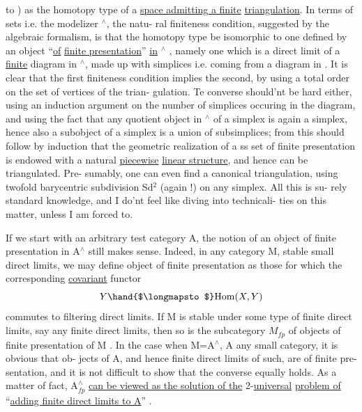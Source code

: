 to )  as the homotopy type of a \uline{space admitting a finite}
\uline{triangulation}.  In terms of  sets i.e.  the modelizer \hand{$\Delta$}$^\wedge$,  the natu-%
ral finiteness condition,  suggested by the algebraic formalism,  is
that the homotopy type be isomorphic to one defined by an object ``\uline{of}
\uline{finite presentation}'' \uline{in} \hand{$\Delta$}$^\wedge$ ,  namely one which is a direct limit of
a \uline{finite} diagram in \hand{$\Delta$}$^\wedge$,  made up with simplices  i.e. coming from a
diagram in \hand{$\Delta$}.  It is clear that the first finiteness condition implies
the second,  by using a total order on the set of vertices of the trian-%
gulation.  Te converse  should'nt be hard either,  using an induction
argument on the number of simplices occuring in the diagram,  and using
the fact that any  quotient object in \hand{$\Delta$}$^\wedge$ of a simplex is
again a simplex,  hence also a subobject of a simplex is a union of
subsimplices;  from this should follow by induction that the geometric
realization of a  ss set of finite presentation is endowed with a
natural  \uline{piecewise} \uline{linear structure},  and hence can be  triangulated. Pre-%
sumably,  one can even find a canonical triangulation,  using twofold
barycentric subdivision Sd$^2$ (again !)  on any simplex.  All this is su-%
rely standard knowledge,  and I do'nt feel like diving into technicali-%
ties on this matter,  unless I am forced to.

If we start with an arbitrary test category A,  the notion of an
object of finite presentation in A$^\wedge$ still makes sense.  Indeed,  in any
category M,  stable   small direct limits,  we may define object of
finite presentation as those for which the corresponding \uline{covariant}
functor
\[ Y \hand{$\longmapsto$} \mathrm{Hom}(X,Y) \]
commutes to filtering  direct limits.  If M is stable under 
some type of finite direct limits,  say  any finite direct limits,  then
so is the  subcategory $M_{fp}$  of objects of finite presentation of M .
In the case when M=A$^\wedge$,  A any small category,  it is obvious that ob-%
jects of A,  and hence finite direct limits of such,  are of finite pre-%
sentation,  and it is not difficult to show that the converse equally
holds.  As a matter of fact,  A$^\wedge_{fp}$  \uline{can be viewed as the solution of the}
2-\uline{universal} \uline{problem of} ``\uline{adding finite direct limits to A}'' .

